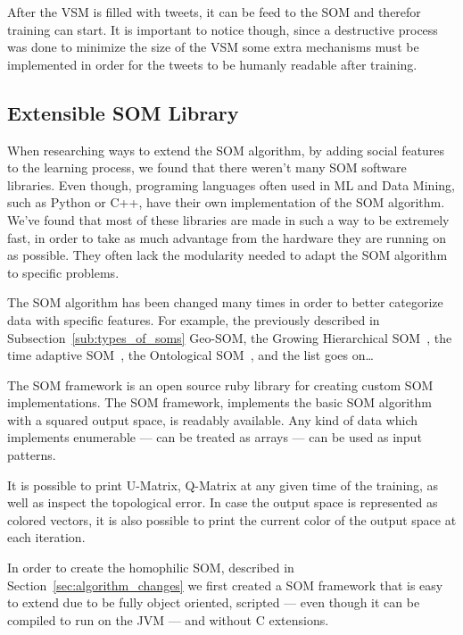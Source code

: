 \documentclass[journal]{IEEEtran}
\begin{document}
After the \ac{VSM} is filled with tweets, it can be feed to the \ac{SOM} and therefor training can start. It is important to notice though, since a destructive process was done to minimize the size of the \ac{VSM} some extra mechanisms must be implemented in order for the tweets to be humanly readable after training.



\subsection{Extensible SOM Library}
\label{sub:extensible_som_library}

When researching ways to extend the \ac{SOM} algorithm, by adding social features to the learning process, we found that there weren't many \ac{SOM} software libraries. Even though, programing languages often used in \ac{ML} and Data Mining, such as Python or C++, have their own implementation of the \ac{SOM} algorithm. We've found that most of these libraries are made in such a way to be extremely fast, in order to take as much advantage from the hardware they are running on as possible. They often lack the modularity needed to adapt the \ac{SOM} algorithm to specific problems.

The \ac{SOM} algorithm has been changed many times in order to better categorize data with specific features. For example, the previously described in Subsection~\ref{sub:types_of_soms} Geo-\ac{SOM}, the Growing Hierarchical \ac{SOM}~\cite[]{1058070}, the time adaptive \ac{SOM}~\cite[]{1187438}, the Ontological \ac{SOM}~\cite[]{5446427}, and the list goes on\dots  

The \ac{SOM} framework is an open source ruby library for creating custom \ac{SOM} implementations. The \ac{SOM} framework, implements the basic \ac{SOM} algorithm with a squared output space, is readably available. Any kind of data which implements enumerable --- can be treated as arrays --- can be used as input patterns. 

It is possible to print \ac{U-Matrix}, \ac{Q-Matrix} at any given time of the training, as well as inspect the topological error. In case the output space is represented as colored vectors, it is also possible to print the current color of the output space at each iteration.

In order to create the homophilic \ac{SOM}, described in Section~\ref{sec:algorithm_changes} we first created a \ac{SOM} framework that is easy to extend due to be fully object oriented, scripted --- even though it can be compiled to run on the JVM --- and without C extensions.
\end{document}
